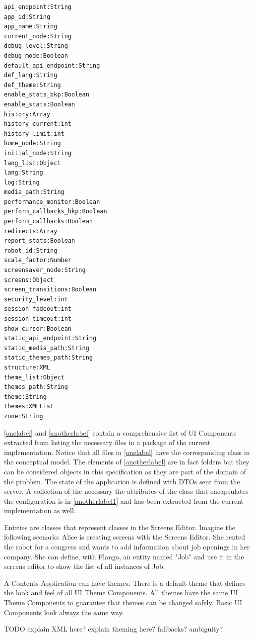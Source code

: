 \begin{lstlisting}[caption=Application State (Settings class), label=anotherlabel2]
api_endpoint:String
app_id:String
app_name:String
current_node:String
debug_level:String
debug_mode:Boolean
default_api_endpoint:String
def_lang:String
def_theme:String
enable_stats_bkp:Boolean
enable_stats:Boolean
history:Array
history_current:int
history_limit:int
home_node:String
initial_node:String
lang_list:Object
lang:String
log:String
media_path:String
performance_monitor:Boolean
perform_callbacks_bkp:Boolean
perform_callbacks:Boolean
redirects:Array
report_stats:Boolean
robot_id:String
scale_factor:Number
screensaver_node:String
screens:Object
screen_transitions:Boolean
security_level:int
session_fadeout:int
session_timeout:int
show_cursor:Boolean
static_api_endpoint:String
static_media_path:String
static_themes_path:String
structure:XML
theme_list:Object
themes_path:String
theme:String
themes:XMLList
zone:String

\end{lstlisting}

\ref{onelabel} and \ref{anotherlabel} contain a comprehensive list of UI Components extracted from listing the necessary files in a package of the current implementation.
Notice that all files in \ref{onelabel} have the corresponding class in the conceptual model.
The elements of \ref{anotherlabel} are in fact folders but they can be considered objects in this specification as they are part of the domain of the problem.
The state of the application is defined with DTOs sent from the server.
A collection of the necessary the attributes of the class that encapsulates the configuration is in \ref{anotherlabel1} and has been extracted from the current implementation as well.

Entities are classes that represent classes in the Screens Editor. 
Imagine the following scenario: Alice is creating screens with the Screens Editor.
She rented the robot for a congress and wants to add information about job openings in her company.
She can define, with Flango, an entity named "Job" and use it in the screens editor to show the list of all instances of Job.

A Contents Application can have themes.
There is a default theme that defines the look and feel of all UI Theme Components.
All themes have the same UI Theme Components to guarantee that themes can be changed safely.
Basic UI Components look always the same way.

TODO explain XML here? explain theming here? fallbacks? ambiguity?

